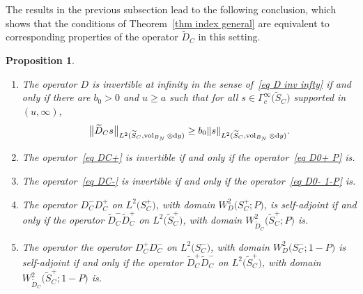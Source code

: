 \documentclass[10pt,a4paper]{amsart}
\numberwithin{equation}{section}
\newtheorem{Proposition}[Theorem]{Proposition}
 { \theoremstyle{definition}
\newtheorem{Definition}[Theorem]{Definition}
\newtheorem{Note}[Theorem]{Note}
\newtheorem{Example}[Theorem]{Example}
\newtheorem{Remark}[Theorem]{Remark} }
\DeclareMathOperator{\vol}{vol}
\begin{document}
The results in the previous subsection lead to the following conclusion, which shows that the conditions of Theorem~\ref{thm index general} are equivalent to corresponding properties of the operator $\widetilde{D}_C$ in this setting.
\begin{Proposition}\label{prop DC D0}\quad
\begin{enumerate}\itemsep=0pt
\item[$(a)$] The operator $D$ is invertible at infinity in the sense of~\eqref{eq D inv infty} if and only if there are $b_0>0$ and $u\geq a$ such that for all $s \in \Gamma^{\infty}_c\big(\widetilde{S}_C\big)$ supported in $(u, \infty)$,
\[
\big\|\widetilde{D}_Cs\big\|_{L^2(\widetilde{S}_C, \vol_{B_N} \otimes {\rm d}y)} \geq b_0 \|s\|_{L^2(\widetilde{S}_C, \vol_{B_N} \otimes {\rm d}y)}.
\]
\item[$(b)$] The operator~\eqref{eq DC+} is invertible if and only if the operator~\eqref{eq D0+ P} is.
\item[$(c)$] The operator~\eqref{eq DC-} is invertible if and only if the operator~\eqref{eq D0- 1-P} is.
\item[$(d)$] The operator $D^-_C D_C^+$ on $L^2\big(S_C^+\big)$, with domain $W^2_D\big(S_C^+; P\big)$, is self-adjoint
 if and only if the operator $\widetilde{D}_C^- \widetilde{D}_C^+$ on $L^2\big(\widetilde{S}_C^+\big)$, with domain $W^2_{\widetilde{D}_C}\big(\widetilde{S}_C^+; P\big)$ is.
\item[$(e)$] The operator
the operator $D^+_C D_C^-$ on $L^2\big(S_C^-\big)$, with domain $W^2_D\big(S_C^-; 1-P\big)$
 is self-adjoint if and only if the operator
 $\widetilde{D}_C^+ \widetilde{D}_C^-$ on $L^2\big(\widetilde{S}_C^+\big)$, with domain $W^2_{\widetilde{D}_C}\big(\widetilde{S}_C^+; 1-P\big)$
 is.
\end{enumerate}
\end{Proposition}
\end{document}
